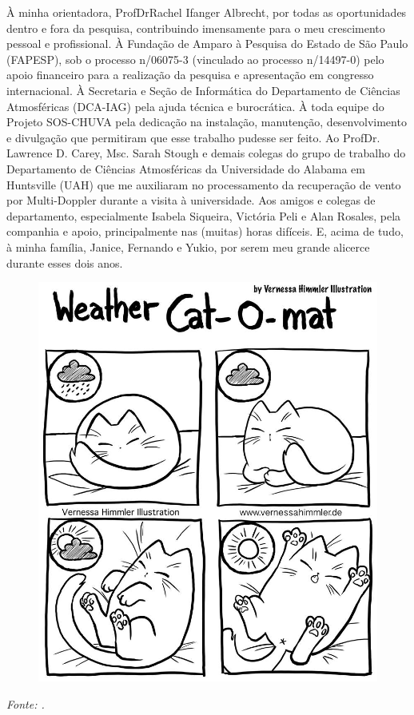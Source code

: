 \begin{agradecimentos}
   À minha orientadora, Prof\textordfeminine\:Dr\textordfeminine\:Rachel Ifanger Albrecht, por todas as oportunidades dentro e fora da pesquisa, contribuindo imensamente para o meu crescimento pessoal e profissional.
   À Fundação de Amparo à Pesquisa do Estado de São Paulo (FAPESP), sob o processo n\textordmasculine{}/06075-3 (vinculado ao processo n\textordmasculine{}/14497-0) pelo apoio financeiro para a realização da pesquisa e apresentação em congresso internacional.
   À Secretaria e Seção de Informática do Departamento de Ciências Atmosféricas (DCA-IAG) pela ajuda técnica e burocrática.
   À toda equipe do Projeto SOS-CHUVA pela dedicação na instalação, manutenção, desenvolvimento e divulgação que permitiram que esse trabalho pudesse ser feito.
   Ao Prof\textordmasculine\:Dr. Lawrence D. Carey, Msc. Sarah Stough e demais colegas do grupo de trabalho do Departamento de Ciências Atmosféricas da Universidade do Alabama em Huntsville (UAH) que me auxiliaram no processamento da recuperação de vento por Multi-Doppler durante a visita à universidade.
   Aos amigos e colegas de departamento, especialmente Isabela Siqueira, Victória Peli e Alan Rosales, pela companhia e apoio, principalmente nas (muitas) horas difíceis.
   E, acima de tudo, à minha família, Janice, Fernando e Yukio, por serem meu grande alicerce durante esses dois anos.
\end{agradecimentos}

\begin{epigrafe}
	\vspace*{\fill}
	\begin{flushright}
		\begin{figure}[hb]
			\includegraphics[width=0.5\columnwidth,right]{figs/cat_meme.jpg}
		\end{figure}
		\textit{Fonte: .}
	\end{flushright}
\end{epigrafe}
